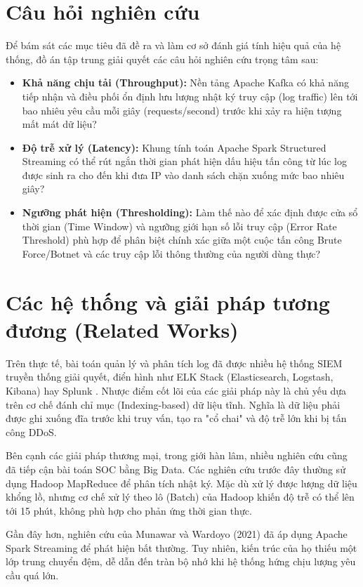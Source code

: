 \documentclass[12pt,a4paper]{report}
\begin{document}
\section{Câu hỏi nghiên cứu}
Để bám sát các mục tiêu đã đề ra và làm cơ sở đánh giá tính hiệu quả của hệ thống, đồ án tập trung giải quyết các câu hỏi nghiên cứu trọng tâm sau:
\begin{itemize}
    \item \textbf{Khả năng chịu tải (Throughput):} Nền tảng Apache Kafka có khả năng tiếp nhận và điều phối ổn định lưu lượng nhật ký truy cập (log traffic) lên tới bao nhiêu yêu cầu mỗi giây (requests/second) trước khi xảy ra hiện tượng mất mát dữ liệu?
    \item \textbf{Độ trễ xử lý (Latency):} Khung tính toán Apache Spark Structured Streaming có thể rút ngắn thời gian phát hiện dấu hiệu tấn công từ lúc log được sinh ra cho đến khi đưa IP vào danh sách chặn xuống mức bao nhiêu giây?
    \item \textbf{Ngưỡng phát hiện (Thresholding):} Làm thế nào để xác định được cửa sổ thời gian (Time Window) và ngưỡng giới hạn số lỗi truy cập (Error Rate Threshold) phù hợp để phân biệt chính xác giữa một cuộc tấn công Brute Force/Botnet và các truy cập lỗi thông thường của người dùng thực?
\end{itemize}

\section{Các hệ thống và giải pháp tương đương (Related Works)}
Trên thực tế, bài toán quản lý và phân tích log đã được nhiều hệ thống SIEM truyền thống giải quyết, điển hình như ELK Stack (Elasticsearch, Logstash, Kibana) hay Splunk \cite{chapple2021}. Nhược điểm cốt lõi của các giải pháp này là chủ yếu dựa trên cơ chế đánh chỉ mục (Indexing-based) dữ liệu tĩnh. Nghĩa là dữ liệu phải được ghi xuống đĩa trước khi truy vấn, tạo ra "cổ chai" và độ trễ lớn khi bị tấn công DDoS.

Bên cạnh các giải pháp thương mại, trong giới hàn lâm, nhiều nghiên cứu cũng đã tiếp cận bài toán SOC bằng Big Data. Các nghiên cứu trước đây thường sử dụng Hadoop MapReduce để phân tích nhật ký. Mặc dù xử lý được lượng dữ liệu khổng lồ, nhưng cơ chế xử lý theo lô (Batch) của Hadoop khiến độ trễ có thể lên tới 15 phút, không phù hợp cho phản ứng thời gian thực.

Gần đây hơn, nghiên cứu của Munawar và Wardoyo (2021) \cite{anomaly_spark} đã áp dụng Apache Spark Streaming để phát hiện bất thường. Tuy nhiên, kiến trúc của họ thiếu một lớp trung chuyển đệm, dễ dẫn đến tràn bộ nhớ khi hệ thống hứng chịu lượng yêu cầu quá lớn.
\end{document}
